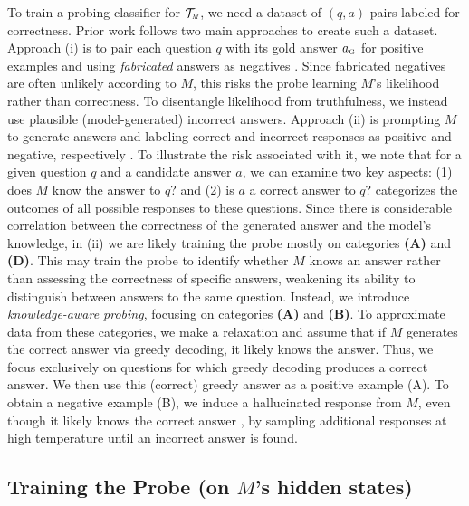 To train a probing classifier for $\mathcal{T}_{\text{\tiny \emph{M}}}$, we need a dataset of $(q,a)$ pairs labeled for correctness.
Prior work follows two main approaches to create such a dataset. Approach (i) is to pair each question $q$ with its gold answer $a_{\text{\tiny G}}$ for positive examples and using \textit{fabricated} answers as negatives \citep{marks2024the,DBLP:conf/emnlp/AzariaM23,su2024unsupervised,rateike2023weakly,2023nips}. Since fabricated negatives are often unlikely according to $M$, this risks the probe learning $M$'s likelihood rather than correctness. To disentangle likelihood from truthfulness, we instead use plausible (model-generated) incorrect answers.
Approach (ii) is prompting $M$ to generate answers and labeling correct and incorrect responses as positive and negative, respectively \citep{zou2023representation,orgad2024llms,snyder2024kdd,yuksekgonul2024iclr}. 
To illustrate the risk associated with it, we note that for a given question $q$ and a candidate answer $a$, we can examine two key aspects: 
(1) does $M$ know the answer to $q$? and 
(2) is $a$ a correct answer to $q$?
categorizes the outcomes of all possible responses to these questions.
Since there is considerable correlation between the correctness of the generated answer and the model's knowledge, in (ii) we are likely training the probe mostly on categories \textbf{(A)} and \textbf{(D)}.
This may train the probe to identify whether $M$ knows an answer rather than assessing the correctness of specific answers, weakening its ability to distinguish between answers to the same question.
Instead, we introduce \emph{knowledge-aware probing}, focusing on categories \textbf{(A)} and \textbf{(B)}.
To approximate data from these categories, we make a relaxation and assume that if $M$ generates the correct answer via greedy decoding, it likely knows the answer.
Thus, we focus exclusively on questions for which greedy decoding produces a correct answer. We then use this (correct) greedy answer as a positive example (A).
To obtain a negative example (B), we induce a hallucinated response from $M$, even though it likely knows the correct answer \citep{simhi2024distinguishing}, by sampling additional responses at high temperature until an incorrect answer is found.


\subsection{Training the Probe (on \texorpdfstring{$M$}{M}'s hidden states)}
\label{sec:probe_training}

